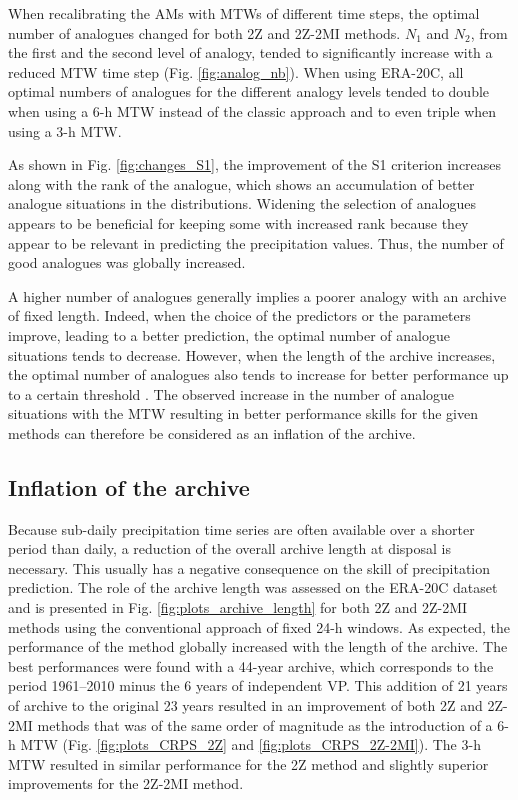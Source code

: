 \documentclass[hess, manuscript]{copernicus}
\begin{document}
	When recalibrating the AMs with MTWs of different time steps, the optimal number of analogues changed for both 2Z and 2Z-2MI methods. $N_{1}$ and $N_{2}$, from the first and the second level of analogy, tended to significantly increase with a reduced MTW time step (Fig. \ref{fig:analog_nb}). When using ERA-20C, all optimal numbers of analogues for the different analogy levels tended to double when using a 6-h MTW instead of the classic approach and to even triple when using a 3-h MTW.
	
	As shown in Fig. \ref{fig:changes_S1}, the improvement of the S1 criterion increases along with the rank of the analogue, which shows an accumulation of better analogue situations in the distributions. Widening the selection of analogues appears to be beneficial for keeping some with increased rank because they appear to be relevant in predicting the precipitation values. Thus, the number of good analogues was globally increased.
	
	A higher number of analogues generally implies a poorer analogy with an archive of fixed length. Indeed, when the choice of the predictors or the parameters improve, leading to a better prediction, the optimal number of analogue situations tends to decrease. However, when the length of the archive increases, the optimal number of analogues also tends to increase for better performance up to a certain threshold \citep[][]{Bontron2004, Hamill2006a}. The observed increase in the number of analogue situations with the MTW resulting in better performance skills for the given methods can therefore be considered as an inflation of the archive.
	
	
	\subsection{Inflation of the archive}
	\label{sec:archive_reduction}
	
	Because sub-daily precipitation time series are often available over a shorter period than daily, a reduction of the overall archive length at disposal is necessary. This usually has a negative consequence on the skill of precipitation prediction. The role of the archive length was assessed on the ERA-20C dataset and is presented in Fig. \ref{fig:plots_archive_length} for both 2Z and 2Z-2MI methods using the conventional approach of fixed 24-h windows. As expected, the performance of the method globally increased with the length of the archive. The best performances were found with a 44-year archive, which corresponds to the period 1961--2010 minus the 6 years of independent VP. This addition of 21 years of archive to the original 23 years resulted in an improvement of both 2Z and 2Z-2MI methods that was of the same order of magnitude as the introduction of a 6-h MTW (Fig. \ref{fig:plots_CRPS_2Z} and \ref{fig:plots_CRPS_2Z-2MI}). The 3-h MTW resulted in similar performance for the 2Z method and slightly superior improvements for the 2Z-2MI method.
	
\end{document}
